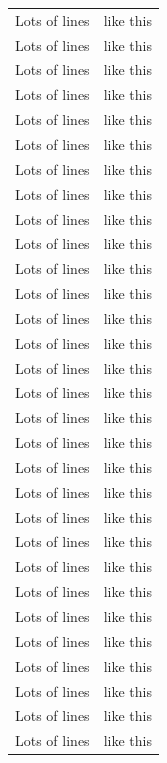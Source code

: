 \begin{longtable}[c]{ | c | c | }
        Lots of lines & like this\\
        Lots of lines & like this\\
        Lots of lines & like this\\
        Lots of lines & like this\\
        Lots of lines & like this\\
        Lots of lines & like this\\
        Lots of lines & like this\\
        Lots of lines & like this\\
        Lots of lines & like this\\
        Lots of lines & like this\\
        Lots of lines & like this\\
        Lots of lines & like this\\
        Lots of lines & like this\\
        Lots of lines & like this\\
        Lots of lines & like this\\
        Lots of lines & like this\\
        Lots of lines & like this\\
        Lots of lines & like this\\
        Lots of lines & like this\\
        Lots of lines & like this\\
        Lots of lines & like this\\
        Lots of lines & like this\\
        Lots of lines & like this\\
        Lots of lines & like this\\
        Lots of lines & like this\\
        Lots of lines & like this\\
        Lots of lines & like this\\
        Lots of lines & like this\\
        Lots of lines & like this\\
        Lots of lines & like this\\
    \end{longtable}

